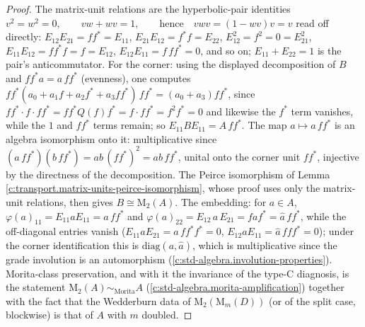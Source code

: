 \documentclass[11pt]{article}
\theoremstyle{definition}
\theoremstyle{plain}
\providecommand{\Mat}{}\renewcommand{\Mat}{\mathrm{M}}
\begin{document}
\begin{proof}
The matrix-unit relations are the hyperbolic-pair identities $v^2 = w^2 = 0, \qquad vw + wv = 1, \qquad \text{hence} \quad vwv = (1 - wv)v = v$ read off directly: $E_{12}E_{21} = ff^* = E_{11}$, $E_{21}E_{12} = f^*f = E_{22}$, $E_{12}^2 = f^2 = 0 = E_{21}^2$, $E_{11}E_{12} = ff^*f = f = E_{12}$, $E_{12}E_{11} = f\,ff^* = 0$, and so on; $E_{11} + E_{22} = 1$ is the pair's anticommutator. For the corner: using the displayed decomposition of $B$ and $ff^* a = a\, ff^*$ (evenness), one computes $ff^* (a_0 + a_1 f + a_2 f^* + a_3 ff^*)\, ff^* = (a_0 + a_3) ff^*$, since $ff^* \cdot f \cdot ff^* = f f^* Q(f) f^* = f \cdot ff^* = f^2 f^* = 0$ and likewise the $f^*$ term vanishes, while the $1$ and $ff^*$ terms remain; so $E_{11}BE_{11} = A\,ff^*$. The map $a \mapsto a\,ff^*$ is an algebra isomorphism onto it: multiplicative since $(a\,ff^*)(b\,ff^*) = ab\,(ff^*)^2 = ab\,ff^*$, unital onto the corner unit $ff^*$, injective by the directness of the decomposition. The Peirce isomorphism of Lemma \ref{c:transport.matrix-units-peirce-isomorphism}, whose proof uses only the matrix-unit relations, then gives $B \cong \Mat_2(A)$. The embedding: for $a \in A$, $\varphi(a)_{11} = E_{11} a E_{11} = a\,ff^*$ and $\varphi(a)_{22} = E_{12}\, a\, E_{21} = f a f^* = \hat{a}\, ff^*$, while the off-diagonal entries vanish ($E_{11} a E_{21} = a\, ff^*f^* = 0$, $E_{12} a E_{11} = \hat a\,f ff^* = 0$); under the corner identification this is $\mathrm{diag}(a, \hat{a})$, which is multiplicative since the grade involution is an automorphism (\ref{c:std-algebra.involution-properties}). Morita-class preservation, and with it the invariance of the type-C diagnosis, is the statement $\Mat_2(A) \sim_{\text{Morita}} A$ (\ref{c:std-algebra.morita-amplification}) together with the fact that the Wedderburn data of $\Mat_2(\Mat_m(D))$ (or of the split case, blockwise) is that of $A$ with $m$ doubled.

\end{proof}
\end{document}

